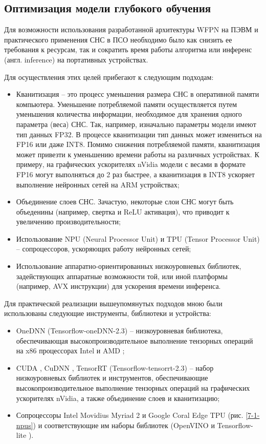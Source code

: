 \subsection{Оптимизация модели глубокого обучения} \label{sect-7-1}

Для возможности использования разработанной архитектуры WFPN на ПЭВМ и практического применения СНС в ПСО необходимо было как снизить ее требования к ресурсам, так и сократить время работы алгоритма или инференс (англ. inference) на портативных устройствах.

Для осуществления этих целей прибегают к следующим подходам:
\begin{itemize}
    \item Кванитизация -- это процесс уменьшения размера СНС в оперативной памяти компьютера. Уменьшение потребляемой памяти осуществляется путем уменьшения количества информации, необходимое для хранения одного параметра (веса) СНС. Так, например, изначально параметры модели имеют тип данных FP32. В процессе кванитизации тип данных может измениться на FP16 или даже INT8. Помимо снижения потребляемой памяти, кванитизация может привезти к уменьшению времени работы на различных устройствах. К примеру, на графических ускорителях nVidia модели с весами в формате FP16 могут выполняться до 2 раз быстрее, а кванитизация в INT8 ускоряет выполнение нейронных сетей на ARM устройствах;
    \item Объединение слоев СНС. Зачастую, некоторые слои СНС могут быть объеденины (например, свертка и ReLU активация), что приводит к увеличению производительности;
    \item Использование NPU (Neural Processor Unit) и TPU (Tensor Processor Unit) -- сопроцессоров, ускоряющих работу нейронных сетей;
    \item Использование аппаратно-ориентированных низкоуровневых библиотек, задействующих аппаратные возможности той, или иной платформы (например, AVX инструкции) для ускорения времени инференса.
\end{itemize}

Для практической реализации вышеупомянутых подходов мною были использованы следующие инструменты, библиотеки и устройства:

\begin{itemize}
    \item OneDNN (Tensorflow-oneDNN-2.3) -- низкоуровневая библиотека, обеспечивающая высокопроизводительное выполнение тензорных операций на x86 процессорах Intel и AMD \cite{lib-onednn};
    \item CUDA \cite{lib-cuda}, CuDNN \cite{lib-cudnn}, TensorRT \cite{lib-tensorrt} (Tensorflow-tensorrt-2.3) -- набор низкоуровневых библиотек и инструментов, обеспечивающие высокопроизводительное выполнение тензорных операций на графических ускорителях nVidia, а также объединение слоев и кванитизацию;
    \item Сопроцессоры Intel Movidius Myriad 2 \cite{lib-movidius} и Google Coral Edge TPU \cite{lib-coral} (рис. \ref{7-1-npus}) и соответствующие им наборы библиотек (OpenVINO \cite{lib-openvino} и Tensorflow-lite \cite{lib-tflite}).
\end{itemize}

